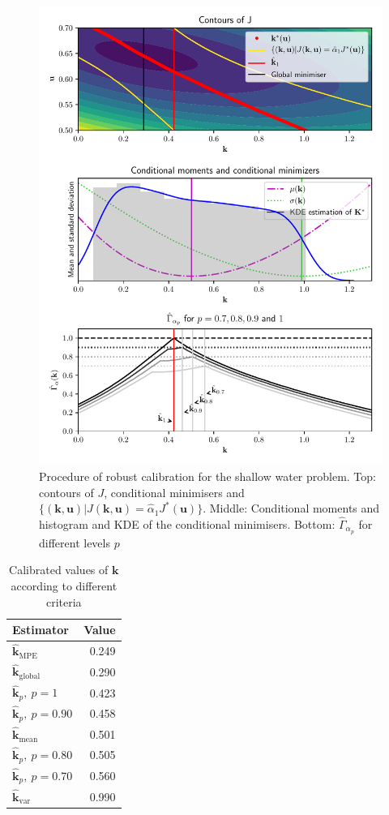 \documentclass[preprint, 1p]{elsarticle}
\newcommand{\hatkmean}{\hat{\mathbf{k}}_{\mathrm{mean}}}
\newcommand{\hatkvar}{\hat{\mathbf{k}}_{\mathrm{var}}}
\newcommand{\hatkmpe}{\hat{\mathbf{k}}_{\mathrm{MPE}}}
\newcommand{\kest}{\hat{\mathbf{k}}}
\begin{document}
\begin{figure}[!h]
\centering
\includegraphics[width=.7\textwidth]{Figures/RobustSWEmis_plots.pdf}
\caption{Procedure of robust calibration for the shallow water problem. Top: contours of $J$, conditional minimisers and $\{(\mathbf{k},\mathbf{u}) | J(\mathbf{k},\mathbf{u}) = \hat{\alpha}_1 J^*(\mathbf{u})\}$. Middle: Conditional moments and histogram and KDE of the conditional minimisers. Bottom: $\hat{\Gamma}_{\alpha_p}$ for different levels $p$}
\label{fig:estimation_swe}
\end{figure}
\begin{table}[!h]
\centering
\caption{Calibrated values of $\mathbf{k}$ according to different criteria}
\begin{tabular}{lr} \toprule
Estimator & Value \\ \midrule
$\hatkmpe$ & 0.249 \\
$\kest_{\mathrm{global}}$ & 0.290 \\
$\hat{\mathbf{k}}_{p},~p=1$ & 0.423 \\ 
$\hat{\mathbf{k}}_p,~p=0.90$ & 0.458 \\ 
$\hatkmean$ & 0.501 \\ 
$\hat{\mathbf{k}}_p,~p=0.80$ & 0.505 \\ 
$\hat{\mathbf{k}}_p,~p=0.70$ & 0.560 \\ 
$\hatkvar$ & 0.990\\ \bottomrule
\end{tabular}
\label{tab:recap_estimates_metaSWE}
\end{table}
\end{document}
